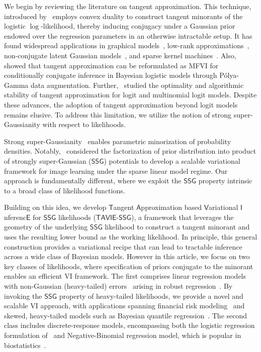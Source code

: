 \documentclass[12pt]{article}
\numberwithin{equation}{section}
\newcommand{\ssg}{\mathsf{SSG}}
\newcommand{\tssg}{\mathsf{TAVIE}\text{-}\mathsf{SSG}}
\begin{document}
We begin by reviewing the literature on tangent approximation. This technique, introduced by~\cite{Jaakkola-Jordan-2000} employs convex duality to construct tangent minorants of the logistic $\log$-likelihood, thereby inducing conjugacy under a Gaussian prior endowed over the regression parameters in an otherwise intractable setup. It has found widespread applications in graphical models~\citep{Jordan1999-graphical-VI}, low-rank approximations~\citep{low-rank-aaprox-VI}, non-conjugate latent Gaussian models~\citep{Khan-Seeger},
and sparse kernel machines~\citep{Shi-Yu}. Also,~\cite{durante2019conditionally} showed that tangent approximation can be reformulated as MFVI for conditionally conjugate inference in Bayesian logistic models through P\'{o}lya-Gamma data augmentation. Further,~\cite{Ghosh-JMLR-VI} studied the optimality and algorithmic stability of tangent approximation for logit and multinomial logit models. Despite these advances, the adoption of tangent approximation beyond logit models remains elusive. To address this limitation, we utilize the notion of strong super-Gaussianity with respect to likelihoods.

Strong super-Gaussianity~\citep{palmer-2005-paper,palmer-book-chapter} enables parametric minorization of probability densities. Notably,~\cite{seeger2011} considered the factorization of prior distribution into product of strongly super-Gaussian ($\ssg$) potentials to develop a scalable variational framework for image learning under the sparse linear model regime. Our approach is fundamentally different, where we exploit the $\ssg$ property intrinsic to a broad class of likelihood functions. 

Building on this idea, we develop $\mathsf{T}$angent $\mathsf{A}$pproximation based $\mathsf{V}$ariational $\mathsf{I}$nferenc$\mathsf{E}$ for $\ssg$ likelihoods ($\tssg$), a framework that leverages the geometry of the underlying $\ssg$ likelihood to construct a tangent minorant and uses the resulting lower bound as the working likelihood. { In principle, this general construction provides a variational recipe that can lead to tractable inference across a wide class of Bayesian models. However in this article, we focus on two key classes of likelihoods, where specification of priors conjugate to the minorant enables an efficient VI framework. The first comprises linear regression models with non-Gaussian (heavy-tailed) errors~\citep{RossellRubio2018} arising in robust regression~\citep{huber-robust-regression}. By invoking the $\ssg$ property of heavy-tailed likelihoods, we provide a novel and scalable VI approach, with applications spanning financial risk modeling~\citep{graphical-modeling-heavy-tailed-markets} and skewed, heavy-tailed models such as Bayesian quantile regression~\citep{Yu-Moeed-Bayesian-QR}. The second class includes discrete-response models, encompassing both the logistic regression formulation of~\cite{Jaakkola-Jordan-2000} and Negative-Binomial regression model, which is popular in biostatistics~\citep{He2021NEBULA}.}
\end{document}
